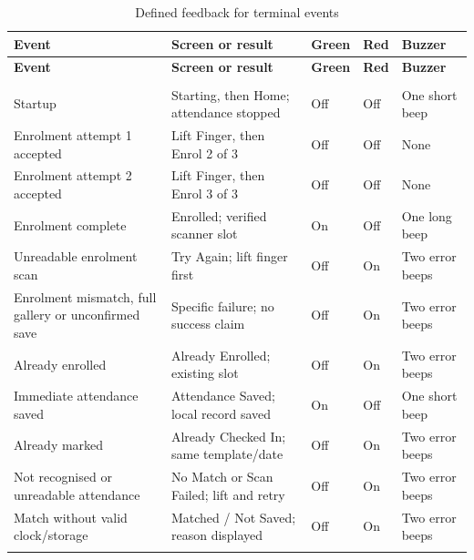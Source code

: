 \begingroup
\singlespacing\small
\setlength{\tabcolsep}{3pt}
\begin{longtable}{@{}>{\RaggedRight\arraybackslash}p{}>{\RaggedRight\arraybackslash}p{}>{\RaggedRight\arraybackslash}p{}>{\RaggedRight\arraybackslash}p{}>{\RaggedRight\arraybackslash}p{}@{}}
\caption{Defined feedback for terminal events}\label{tab:terminal-feedback}\\
\toprule
\textbf{Event} & \textbf{Screen or result} & \textbf{Green} & \textbf{Red} & \textbf{Buzzer} \\
\midrule\endfirsthead
\toprule
\textbf{Event} & \textbf{Screen or result} & \textbf{Green} & \textbf{Red} & \textbf{Buzzer} \\
\midrule\endhead
\midrule\multicolumn{5}{r}{Continued on next page}\\\endfoot
\bottomrule\endlastfoot
Startup & Starting, then Home; attendance stopped & Off & Off & One short beep \\ \addlinespace
Enrolment attempt 1 accepted & Lift Finger, then Enrol 2 of 3 & Off & Off & None \\ \addlinespace
Enrolment attempt 2 accepted & Lift Finger, then Enrol 3 of 3 & Off & Off & None \\ \addlinespace
Enrolment complete & Enrolled; verified scanner slot & On & Off & One long beep \\ \addlinespace
Unreadable enrolment scan & Try Again; lift finger first & Off & On & Two error beeps \\ \addlinespace
Enrolment mismatch, full gallery or unconfirmed save & Specific failure; no success claim & Off & On & Two error beeps \\ \addlinespace
Already enrolled & Already Enrolled; existing slot & Off & On & Two error beeps \\ \addlinespace
Immediate attendance saved & Attendance Saved; local record saved & On & Off & One short beep \\ \addlinespace
Already marked & Already Checked In; same template/date & Off & On & Two error beeps \\ \addlinespace
Not recognised or unreadable attendance & No Match or Scan Failed; lift and retry & Off & On & Two error beeps \\ \addlinespace
Match without valid clock/storage & Matched / Not Saved; reason displayed & Off & On & Two error beeps \\ \addlinespace

\end{longtable}
